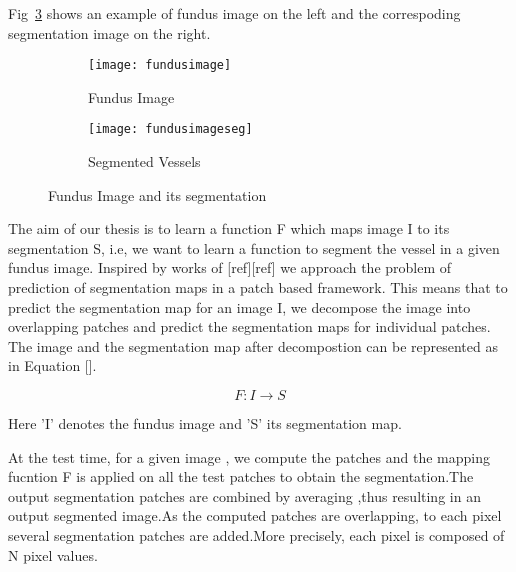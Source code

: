 %	
%
%
%
Fig~\ref{fig:fundus example} shows an example of fundus image on the left and the correspoding segmentation image on the right.\\

\begin{figure}
	\centering
	\begin{subfigure}[b]{0.45\textwidth}
		\centering
		\texttt{[image: fundusimage]}
		\caption{Fundus Image}
		\label{fig:fundusex}
	\end{subfigure}
	\hfill
	\begin{subfigure}[b]{0.45\textwidth}
		\centering
		\texttt{[image: fundusimageseg]}
		\caption{Segmented Vessels}
		\label{fig:fundusex seg}
	\end{subfigure}
	\caption{Fundus Image and its segmentation}
	\label{fig:fundus example}
\end{figure}

The aim of our thesis is to learn a function F which maps image I to its segmentation S, i.e, we want to learn a function to segment the vessel in a given fundus image. Inspired by works of [ref][ref] we approach the problem of prediction of segmentation maps in a  patch based framework. This means that to predict the segmentation map for an image I, we decompose the image into overlapping patches and predict the segmentation maps for individual patches. The image and the segmentation map after decompostion can be represented as in Equation [].

$$ F: I \rightarrow S $$

Here 'I' denotes the fundus image and 'S' its segmentation map.

At the test time, for a given image , we compute the patches and the mapping fucntion F is applied on all the test patches to obtain the segmentation.The output segmentation patches are combined by averaging ,thus resulting in an output segmented image.As the computed patches are overlapping, to each pixel several segmentation patches are added.More precisely, each pixel is composed of N pixel values.\\

